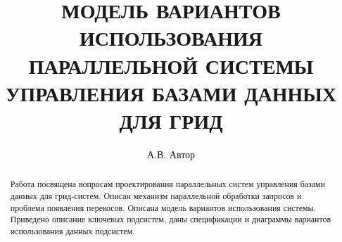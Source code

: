 \documentclass[11pt,oneside]{article}
\date{}
\begin{document}
\newcommand{\phan}{\hspace*{0cm}}
\newcommand{\comment}{}
\author{А.В. Автор}
\title{МОДЕЛЬ ВАРИАНТОВ ИСПОЛЬЗОВАНИЯ ПАРАЛЛЕЛЬНОЙ СИСТЕМЫ УПРАВЛЕНИЯ БАЗАМИ ДАННЫХ ДЛЯ ГРИД}
\maketitle{}
\begin{abstract}
Работа посвящена вопросам проектирования параллельных систем управления базами данных для грид-систем. Описан механизм параллельной обработки запросов и проблема появления перекосов. Описана модель вариантов использования системы. Приведено описание ключевых подсистем, даны спецификации и диаграммы вариантов использования данных подсистем.
\end{abstract}


\end{document}
